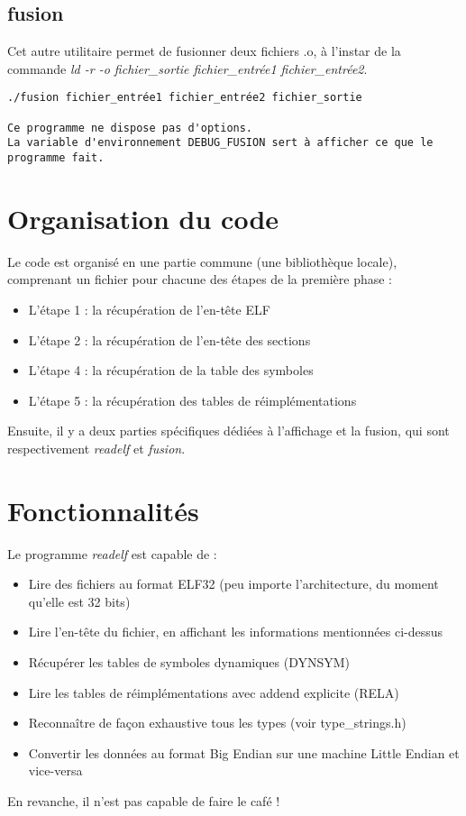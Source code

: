 \documentclass[a4paper,11pt]{article}
\begin{document}
\subsection{fusion}
Cet autre utilitaire permet de fusionner deux fichiers .o, à l'instar de la commande \textit{ld -r -o fichier\_sortie fichier\_entrée1 fichier\_entrée2}.
\begin{verbatim}
./fusion fichier_entrée1 fichier_entrée2 fichier_sortie

Ce programme ne dispose pas d'options.
La variable d'environnement DEBUG_FUSION sert à afficher ce que le programme fait.
\end{verbatim}

\section{Organisation du code}
Le code est organisé en une partie commune (une bibliothèque locale), comprenant un fichier pour chacune des étapes de la première phase :
\begin{itemize}
\item L'étape 1 : la récupération de l'en-tête ELF
\item L'étape 2 : la récupération de l'en-tête des sections
\item L'étape 4 : la récupération de la table des symboles
\item L'étape 5 : la récupération des tables de réimplémentations 
\end{itemize}

Ensuite, il y a deux parties spécifiques dédiées à l'affichage et la fusion, qui sont respectivement \textit{readelf} et \textit{fusion}.

\section{Fonctionnalités}
Le programme \textit{readelf} est capable de :
\begin{itemize}
\item Lire des fichiers au format ELF32 (peu importe l'architecture, du moment qu'elle est 32 bits)
\item Lire l'en-tête du fichier, en affichant les informations mentionnées ci-dessus
\item Récupérer les tables de symboles dynamiques (DYNSYM)
\item Lire les tables de réimplémentations avec addend explicite (RELA)
\item Reconnaître de façon exhaustive tous les types (voir type\_strings.h)
\item Convertir les données au format Big Endian sur une machine Little Endian et vice-versa
\end{itemize}
En revanche, il n'est pas capable de faire le café !
\end{document}
